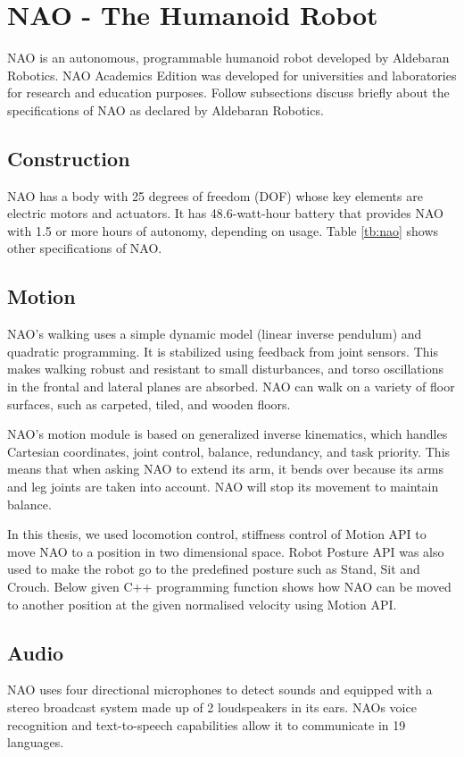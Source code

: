 \section{NAO - The Humanoid Robot} 
NAO is an autonomous, programmable humanoid robot developed by Aldebaran Robotics. NAO Academics Edition was developed for universities and laboratories for research and education purposes. Follow subsections discuss briefly about the specifications of NAO as declared by Aldebaran Robotics.

\subsection{Construction}
NAO has a body with 25 degrees of freedom (DOF) whose key elements are electric motors and actuators. It has 48.6-watt-hour battery that provides NAO with 1.5 or more hours of autonomy, depending on usage. Table \ref{tb:nao} shows other specifications of NAO.

\subsection{Motion}
NAO's walking uses a simple dynamic model (linear inverse pendulum) and quadratic programming. It is stabilized using feedback from joint sensors. This makes walking robust and resistant to small disturbances, and torso oscillations in the frontal and lateral planes are absorbed. NAO can walk on a variety of floor surfaces, such as carpeted, tiled, and wooden floors. 

NAO's motion module is based on generalized inverse kinematics, which handles Cartesian coordinates, joint control, balance, redundancy, and task priority. This means that when asking NAO to extend its arm, it bends over because its arms and leg joints are taken into account. NAO will stop its movement to maintain balance.

In this thesis, we used locomotion control, stiffness control of Motion API to move NAO to a position in two dimensional space. Robot Posture API was also used to make the robot go to the predefined posture such as Stand, Sit and Crouch. Below given C++ programming function shows how NAO can be moved to another position at the given normalised velocity using Motion API.

\subsection{Audio}
NAO uses four directional microphones to detect sounds and equipped with a stereo broadcast system made up of 2 loudspeakers in its ears. NAOs voice recognition and text-to-speech capabilities allow it to communicate in 19 languages. 

